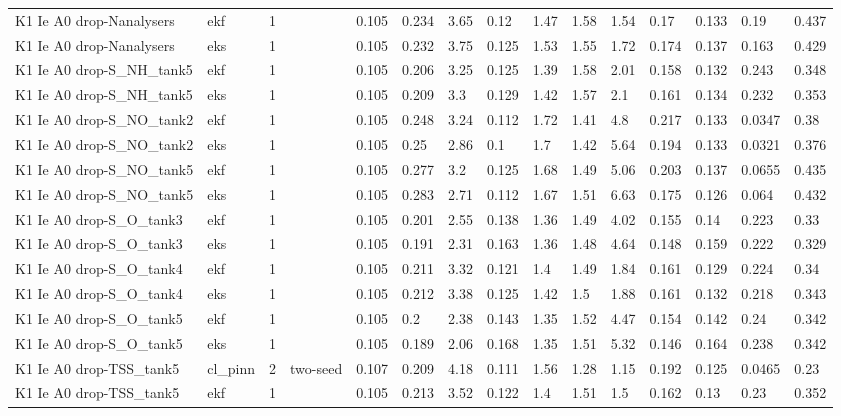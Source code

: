 \begin{table}[t]
\begin{tabular}{lllllllllllllll}
K1 Ie A0 drop-Nanalysers & ekf & 1 &  & 0.105 & 0.234 & 3.65 & 0.12 & 1.47 & 1.58 & 1.54 & 0.17 & 0.133 & 0.19 & 0.437 \\
K1 Ie A0 drop-Nanalysers & eks & 1 &  & 0.105 & 0.232 & 3.75 & 0.125 & 1.53 & 1.55 & 1.72 & 0.174 & 0.137 & 0.163 & 0.429 \\
K1 Ie A0 drop-S\_NH\_tank5 & ekf & 1 &  & 0.105 & 0.206 & 3.25 & 0.125 & 1.39 & 1.58 & 2.01 & 0.158 & 0.132 & 0.243 & 0.348 \\
K1 Ie A0 drop-S\_NH\_tank5 & eks & 1 &  & 0.105 & 0.209 & 3.3 & 0.129 & 1.42 & 1.57 & 2.1 & 0.161 & 0.134 & 0.232 & 0.353 \\
K1 Ie A0 drop-S\_NO\_tank2 & ekf & 1 &  & 0.105 & 0.248 & 3.24 & 0.112 & 1.72 & 1.41 & 4.8 & 0.217 & 0.133 & 0.0347 & 0.38 \\
K1 Ie A0 drop-S\_NO\_tank2 & eks & 1 &  & 0.105 & 0.25 & 2.86 & 0.1 & 1.7 & 1.42 & 5.64 & 0.194 & 0.133 & 0.0321 & 0.376 \\
K1 Ie A0 drop-S\_NO\_tank5 & ekf & 1 &  & 0.105 & 0.277 & 3.2 & 0.125 & 1.68 & 1.49 & 5.06 & 0.203 & 0.137 & 0.0655 & 0.435 \\
K1 Ie A0 drop-S\_NO\_tank5 & eks & 1 &  & 0.105 & 0.283 & 2.71 & 0.112 & 1.67 & 1.51 & 6.63 & 0.175 & 0.126 & 0.064 & 0.432 \\
K1 Ie A0 drop-S\_O\_tank3 & ekf & 1 &  & 0.105 & 0.201 & 2.55 & 0.138 & 1.36 & 1.49 & 4.02 & 0.155 & 0.14 & 0.223 & 0.33 \\
K1 Ie A0 drop-S\_O\_tank3 & eks & 1 &  & 0.105 & 0.191 & 2.31 & 0.163 & 1.36 & 1.48 & 4.64 & 0.148 & 0.159 & 0.222 & 0.329 \\
K1 Ie A0 drop-S\_O\_tank4 & ekf & 1 &  & 0.105 & 0.211 & 3.32 & 0.121 & 1.4 & 1.49 & 1.84 & 0.161 & 0.129 & 0.224 & 0.34 \\
K1 Ie A0 drop-S\_O\_tank4 & eks & 1 &  & 0.105 & 0.212 & 3.38 & 0.125 & 1.42 & 1.5 & 1.88 & 0.161 & 0.132 & 0.218 & 0.343 \\
K1 Ie A0 drop-S\_O\_tank5 & ekf & 1 &  & 0.105 & 0.2 & 2.38 & 0.143 & 1.35 & 1.52 & 4.47 & 0.154 & 0.142 & 0.24 & 0.342 \\
K1 Ie A0 drop-S\_O\_tank5 & eks & 1 &  & 0.105 & 0.189 & 2.06 & 0.168 & 1.35 & 1.51 & 5.32 & 0.146 & 0.164 & 0.238 & 0.342 \\
K1 Ie A0 drop-TSS\_tank5 & cl\_pinn & 2 & two-seed & 0.107 & 0.209 & 4.18 & 0.111 & 1.56 & 1.28 & 1.15 & 0.192 & 0.125 & 0.0465 & 0.23 \\
K1 Ie A0 drop-TSS\_tank5 & ekf & 1 &  & 0.105 & 0.213 & 3.52 & 0.122 & 1.4 & 1.51 & 1.5 & 0.162 & 0.13 & 0.23 & 0.352 \\

\end{tabular}
\end{table}
